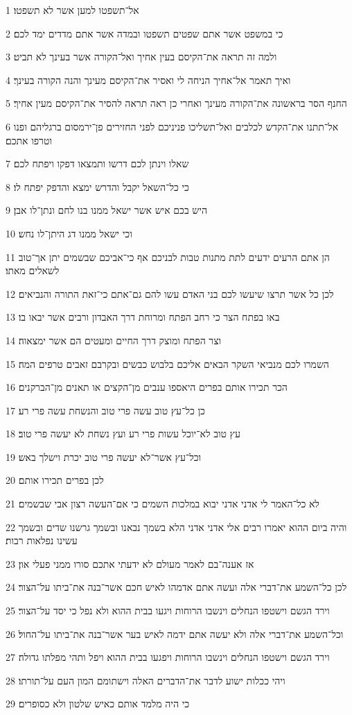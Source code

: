\par 1 אל־תשפטו למען אשר לא תשפטו׃
\par 2 כי במשפט אשר אתם שפטים תשפטו ובמדה אשר אתם מדדים ימד לכם׃
\par 3 ולמה זה תראה את־הקיסם בעין אחיך ואל־הקורה אשר בעינך לא תביט׃
\par 4 ואיך תאמר אל־אחיך הניחה לי ואסיר את־הקיסם מעינך והנה הקורה בעינך׃
\par 5 החנף הסר בראשונה את־הקורה מעינך ואחרי כן ראה תראה להסיר את־הקיסם מעין אחיך׃
\par 6 אל־תתנו את־הקדש לכלבים ואל־תשליכו פניניכם לפני החזירים פן־ירמסום ברגליהם ופנו וטרפו אתכם׃
\par 7 שאלו וינתן לכם דרשו ותמצאו דפקו ויפתח לכם׃
\par 8 כי כל־השאל יקבל והדרש ימצא והדפק יפתח לו׃
\par 9 היש בכם איש אשר ישאל ממנו בנו לחם ונתן־לו אבן׃
\par 10 וכי ישאל ממנו דג היתן־לו נחש׃
\par 11 הן אתם הרעים ידעים לתת מתנות טבות לבניכם אף כי־אביכם שבשמים יתן אך־טוב לשאלים מאתו׃
\par 12 לכן כל אשר תרצו שיעשו לכם בני האדם עשו להם גם־אתם כי־זאת התורה והנביאים׃
\par 13 באו בפתח הצר כי רחב הפתח ומרוחת דרך האבדון ורבים אשר יבאו בו׃
\par 14 וצר הפתח ומוצק דרך החיים ומעטים הם אשר ימצאוה׃
\par 15 השמרו לכם מנביאי השקר הבאים אליכם בלבוש כבשים ובקרבם זאבים טרפים המה׃
\par 16 הכר תכירו אותם בפרים היאספו ענבים מן־הקצים או תאנים מן־הברקנים׃
\par 17 כן כל־עץ טוב עשה פרי טוב והנשחת עשה פרי רע׃
\par 18 עץ טוב לא־יוכל עשות פרי רע ועץ נשחת לא יעשה פרי טוב׃
\par 19 וכל־עץ אשר־לא יעשה פרי טוב יכרת וישלך באש׃
\par 20 לכן בפרים תכירו אותם׃
\par 21 לא כל־האמר לי אדני אדני יבוא במלכות השמים כי אם־העשה רצון אבי שבשמים׃
\par 22 והיה ביום ההוא יאמרו רבים אלי אדני אדני הלא בשמך נבאנו ובשמך גרשנו שדים ובשמך עשינו נפלאות רבות׃
\par 23 אז אענה־בם לאמר מעולם לא ידעתי אתכם סורו ממני פעלי און׃
\par 24 לכן כל־השמע את־דברי אלה ועשה אתם אדמהו לאיש חכם אשר־בנה את־ביתו על־הצור׃
\par 25 וירד הגשם וישטפו הנחלים וינשבו הרוחות ויגעו בבית ההוא ולא נפל כי יסד על־הצור׃
\par 26 וכל־השמע את־דברי אלה ולא יעשה אתם ידמה לאיש בער אשר־בנה את־ביתו על־החול׃
\par 27 וירד הגשם וישטפו הנחלים וינשבו הרוחות ויפגעו בבית ההוא ויפל ותהי מפלתו גדולה׃
\par 28 ויהי ככלות ישוע לדבר את־הדברים האלה וישתומם המון העם על־תורתו׃
\par 29 כי היה מלמד אותם כאיש שלטון ולא כסופרים׃

